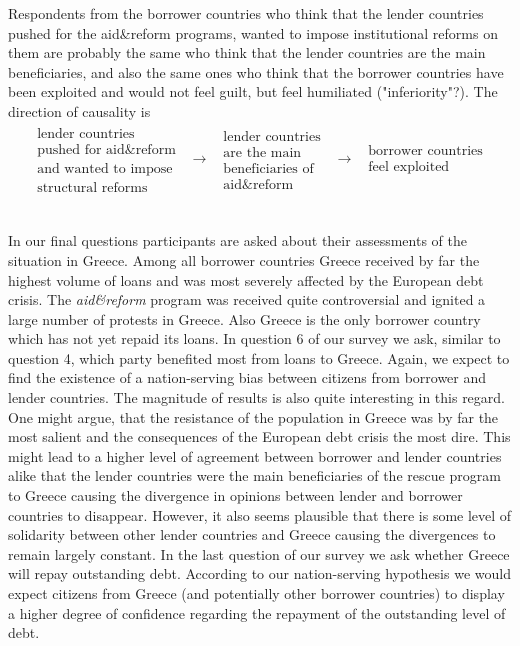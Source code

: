 Respondents from the borrower countries who think that the lender countries
pushed for the aid\&reform programs, wanted to impose institutional reforms
on them are probably the same who think that the lender countries are the
main beneficiaries, and also the same ones who think that the borrower
countries have been exploited and would not feel guilt, but feel humiliated
("inferiority"?). The direction of causality is%
\begin{equation*}
\begin{array}{ccccc}
\begin{array}{c}
\text{lender countries} \\ 
\text{pushed for aid\&reform} \\ 
\text{and wanted to impose} \\ 
\text{structural reforms}%
\end{array}
& \rightarrow  & 
\begin{array}{c}
\text{lender countries} \\ 
\text{are the main} \\ 
\text{beneficiaries of} \\ 
\text{aid\&reform}%
\end{array}
& \rightarrow  & 
\begin{array}{c}
\text{borrower countries} \\ 
\text{feel exploited}%
\end{array}%
\end{array}%
\end{equation*}

\\
In our final questions participants are asked about their assessments of
the situation in Greece. Among all borrower countries Greece received by far the 
highest volume of loans and was most severely affected by the European debt crisis.
The \textit{aid&reform} program was received quite controversial and ignited a large number 
of protests in Greece. Also Greece is the only borrower country which has not yet repaid its loans. 
In question 6 of our survey we ask, similar to question 4, which party benefited most from loans
to Greece. Again, we expect to find the existence of a nation-serving bias between citizens from borrower
and lender countries. The magnitude of results is also quite interesting in this regard. One might argue, that 
the resistance of the population in Greece was by far the most salient and the consequences of the European debt crisis
the most dire. This might lead to a higher level of agreement between borrower and lender countries alike that the lender countries
were the main beneficiaries of the rescue program to Greece causing the divergence in opinions between lender and borrower countries to 
disappear. However, it also seems plausible that there is some level of solidarity between other lender countries and Greece causing 
the divergences to remain largely constant. In the last question of our survey we ask whether Greece will repay outstanding debt. According to 
our nation-serving hypothesis we would expect citizens from Greece (and potentially other borrower countries) to display a higher degree of confidence 
regarding the repayment of the outstanding level of debt. 

